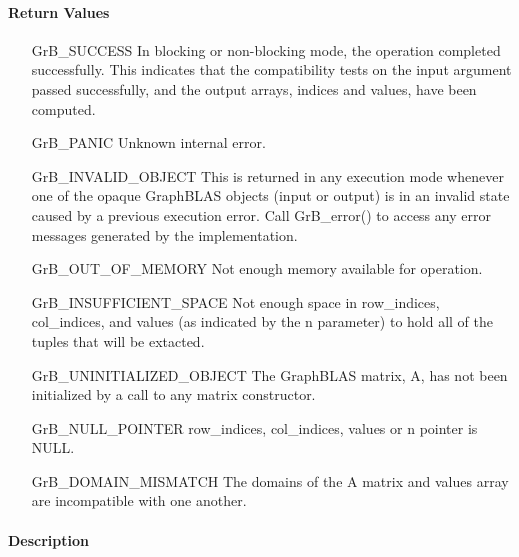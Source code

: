 \paragraph{Return Values}

\begin{itemize}[leftmargin=2.1in]
    \item[{\sf GrB\_SUCCESS}]  In blocking or non-blocking mode, the operation 
    completed successfully. This indicates that the compatibility tests on 
    the input argument passed successfully, and the output arrays, {\sf indices}
    and {\sf values}, have been computed.

    \item[{\sf GrB\_PANIC}]   Unknown internal error.
    
    \item[{\sf GrB\_INVALID\_OBJECT}] This is returned in any execution mode 
    whenever one of the opaque GraphBLAS objects (input or output) is in an invalid 
    state caused by a previous execution error.  Call {\sf GrB\_error()} to access 
    any error messages generated by the implementation.

    \item[{\sf GrB\_OUT\_OF\_MEMORY}]  Not enough memory available for operation.

    \item[{\sf GrB\_INSUFFICIENT\_SPACE}]  Not enough space in {\sf row\_indices}, 
    {\sf col\_indices}, and {\sf values} (as indicated by the {\sf n} parameter) 
    to hold all of the tuples that will be extacted.
    
    \item[{\sf GrB\_UNINITIALIZED\_OBJECT}]  The GraphBLAS matrix, {\sf A}, has 
    not been initialized by a call to any matrix constructor.
    
    \item[{\sf GrB\_NULL\_POINTER}]  {\sf row\_indices}, {\sf col\_indices}, 
    {\sf values} or {\sf n} pointer is {\sf NULL}.
    
    \item[\sf GrB\_DOMAIN\_MISMATCH] The domains of the {\sf A} matrix and 
    {\sf values} array are incompatible with one another.
\end{itemize}

\paragraph{Description}


